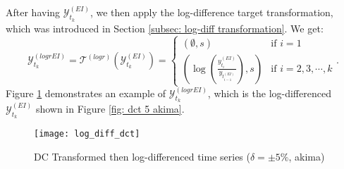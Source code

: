 After having $\mathcal{Y}^{(EI)}_{t_k}$, we then apply the log-difference target transformation, which was introduced in Section \ref{subsec: log-diff transformation}. We get:
\begin{equation*}
    \mathcal{Y}^{(logrEI)}_{t_k} = \mathcal{T}^{(logr)}(\mathcal{Y}^{(EI)}_{t_k}) = \begin{cases}
        (\emptyset, s)  &\text{if $i = 1$} \\
        (\log(\frac{y^{(EI)}_{t_i}}{y_{t^{(EI)}_{i-1}}}), s) &\text{if $i = 2, 3, \cdots, k$}
    \end{cases}.
\end{equation*}
Figure \ref{fig: log-diff dct} demonstrates an example of $\mathcal{Y}^{(logrEI)}_{t_k}$, which is the log-differenced $\mathcal{Y}^{(EI)}_{t_k}$ shown in Figure \ref{fig: dct 5 akima}.
\begin{figure}[H]
    \centering
    \texttt{[image: log\_diff\_dct]}
    \caption{DC Transformed then log-differenced time series ($\delta = \pm 5\%$, akima)}
    {\raggedright \footnotesize \par}
    \label{fig: log-diff dct}
\end{figure}

